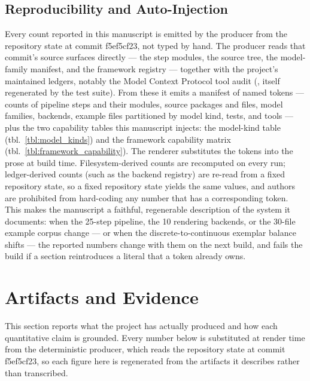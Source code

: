 \documentclass[
  english,
  9pt,
]{extarticle}
\begin{document}
\subsection{Reproducibility and
Auto-Injection}\label{reproducibility-and-auto-injection}

Every count reported in this manuscript is emitted by the producer
 from the
repository state at commit f5ef5cf23, not typed by hand. The producer
reads that commit's source surfaces directly --- the step modules, the
source tree, the model-family manifest, and the framework registry ---
together with the project's maintained ledgers, notably the Model
Context Protocol tool audit (,
itself regenerated by the test suite). From these it emits a manifest of
named tokens --- counts of pipeline steps and their modules, source
packages and files, model families, backends, example files partitioned
by model kind, tests, and tools --- plus the two capability tables this
manuscript injects: the model-kind table (tbl.~\ref{tbl:model_kinds})
and the framework capability matrix
(tbl.~\ref{tbl:framework_capability}). The renderer substitutes the
tokens into the prose at build time. Filesystem-derived counts are
recomputed on every run; ledger-derived counts (such as the backend
registry) are re-read from a fixed repository state, so a fixed
repository state yields the same values, and authors are prohibited from
hard-coding any number that has a corresponding token. This makes the
manuscript a faithful, regenerable description of the system it
documents: when the 25-step pipeline, the 10 rendering backends, or the
30-file example corpus change --- or when the discrete-to-continuous
exemplar balance shifts --- the reported numbers change with them on the
next build, and  fails the
build if a section reintroduces a literal that a token already owns.

\newpage

\section{Artifacts and Evidence}\label{sec:artifacts_evidence}

This section reports what the project has actually produced and how each
quantitative claim is grounded. Every number below is substituted at
render time from the deterministic producer, which reads the repository
state at commit f5ef5cf23, so each figure here is regenerated from the
artifacts it describes rather than transcribed.
\end{document}
